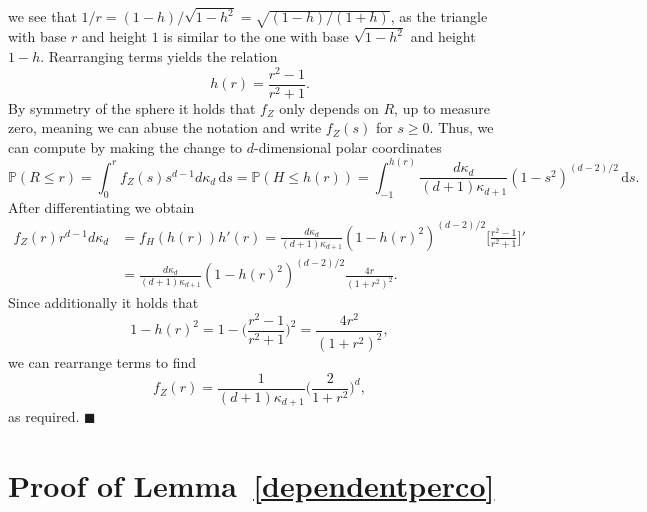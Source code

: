 \documentclass[11pt]{article}%
\newenvironment{proofof}[1]{\vspace{1ex}\noindent{\bf Proof of #1.}}{\hspace*{\fill}$\blacksquare$\vspace{1ex}}
\newcommand{\Pro}{\mathbb{P}}
\begin{document}
\begin{proofof}{\cref{lem:piunif}}
 we see that $ 1/r=(1-h)/\sqrt{1-h^2}=\sqrt{(1-h)/(1+h)} $, as the triangle with base $ r $ and height $ 1 $ is similar to the one with base $ \sqrt{1-h^2} $ and height $ 1-h $. Rearranging terms yields the relation
\begin{equation*}
	h(r)=\frac{r^2-1}{r^2+1}.
\end{equation*} 
By symmetry of the sphere it holds that $ f_{Z} $ only depends on $ R $, up to measure zero, meaning we can abuse the notation and write $f_Z(s)$ for $s\geq 0$. Thus, we can compute by making the change to $ d $-dimensional polar coordinates
\begin{equation*}
	\Pro(R\leq r)=\int_{0}^{r}f_{Z}(s)s^{d-1}d\kappa_d\,\text{d}s=\Pro(H\leq h(r))=\int_{-1}^{h(r)}\frac{d\kappa_d}{(d+1)\kappa_{d+1}}(1-s^2)^{(d-2)/2}\,\text{d}s.
\end{equation*}
After differentiating we obtain
\begin{equation*}
	\begin{split}
		f_{Z}(r)r^{d-1}d\kappa_d&=f_H(h(r))h'(r)=\frac{d \kappa_d}{(d+1)\kappa_{d+1}}(1-h(r)^2)^{(d-2)/2}\bigg[\frac{r^2-1}{r^2+1}\bigg]'
		\\&=\frac{d \kappa_d}{(d+1)\kappa_{d+1}}(1-h(r)^2)^{(d-2)/2}\frac{4r}{(1+r^2)^2}.
	\end{split}
\end{equation*}
Since additionally it holds that 
\begin{equation*}
	1-h(r)^2=1-\bigg(\frac{r^2-1}{r^2+1}\bigg)^2=\frac{4r^2}{(1+r^2)^2},
\end{equation*}
we can rearrange terms to find
\begin{equation*}
	f_{Z}(r)=\frac{1}{(d+1)\kappa_{d+1}}\bigg(\frac{2}{1+r^2}\bigg)^d,
\end{equation*}
as required.
\end{proofof}


\section{Proof of Lemma~\ref{dependentperco}\label{sec:depperco}}
\end{document}
